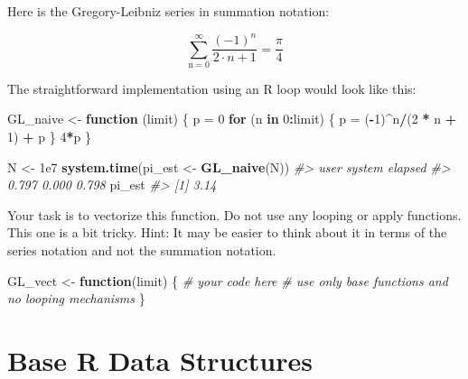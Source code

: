 \documentclass[]{book}
\newenvironment{Shaded}{\begin{snugshade}}{\end{snugshade}}
\newcommand{\CommentTok}[1]{\textcolor[rgb]{0.56,0.35,0.01}{\textit{#1}}}
\newcommand{\ControlFlowTok}[1]{\textcolor[rgb]{0.13,0.29,0.53}{\textbf{#1}}}
\newcommand{\DecValTok}[1]{\textcolor[rgb]{0.00,0.00,0.81}{#1}}
\newcommand{\FloatTok}[1]{\textcolor[rgb]{0.00,0.00,0.81}{#1}}
\newcommand{\KeywordTok}[1]{\textcolor[rgb]{0.13,0.29,0.53}{\textbf{#1}}}
\newcommand{\NormalTok}[1]{#1}
\newcommand{\OperatorTok}[1]{\textcolor[rgb]{0.81,0.36,0.00}{\textbf{#1}}}
\newcommand{\StringTok}[1]{\textcolor[rgb]{0.31,0.60,0.02}{#1}}
\theoremstyle{definition}
\theoremstyle{definition}
\theoremstyle{definition}
\theoremstyle{remark}
\begin{document}
Here is the Gregory-Leibniz series in summation notation:

\begin{equation}
\sum_{\text{n}=0}^{\infty} \frac{(-1)^n}{2\cdot n + 1} = \frac{\pi}{4}
\end{equation}

The straightforward implementation using an R loop would look like this:

\begin{Shaded}
\begin{Highlighting}[]
\NormalTok{GL_naive <-}\StringTok{ }\ControlFlowTok{function}\NormalTok{ (limit) \{}
\NormalTok{  p =}\StringTok{ }\DecValTok{0}
  \ControlFlowTok{for}\NormalTok{ (n }\ControlFlowTok{in} \DecValTok{0}\OperatorTok{:}\NormalTok{limit) \{}
\NormalTok{    p =}\StringTok{ }\NormalTok{(}\OperatorTok{-}\DecValTok{1}\NormalTok{)}\OperatorTok{^}\NormalTok{n}\OperatorTok{/}\NormalTok{(}\DecValTok{2} \OperatorTok{*}\StringTok{ }\NormalTok{n }\OperatorTok{+}\StringTok{ }\DecValTok{1}\NormalTok{) }\OperatorTok{+}\StringTok{ }\NormalTok{p}
\NormalTok{    \}}
  \DecValTok{4}\OperatorTok{*}\NormalTok{p}
\NormalTok{\}}

\NormalTok{N <-}\StringTok{ }\FloatTok{1e7}
\KeywordTok{system.time}\NormalTok{(pi_est <-}\StringTok{ }\KeywordTok{GL_naive}\NormalTok{(N))}
\CommentTok{#>    user  system elapsed }
\CommentTok{#>   0.797   0.000   0.798}
\NormalTok{pi_est}
\CommentTok{#> [1] 3.14}
\end{Highlighting}
\end{Shaded}

Your task is to vectorize this function. Do not use any looping or apply
functions. This one is a bit tricky. Hint: It may be easier to think
about it in terms of the series notation and not the summation notation.

\begin{Shaded}
\begin{Highlighting}[]
\NormalTok{GL_vect <-}\StringTok{ }\ControlFlowTok{function}\NormalTok{(limit) \{}
  \CommentTok{# your code here}
  \CommentTok{# use only base functions and no looping mechanisms}
\NormalTok{\}}
\end{Highlighting}
\end{Shaded}

\hypertarget{base-r-data-structures}{%
\chapter{Base R Data Structures}\label{base-r-data-structures}}
\end{document}
